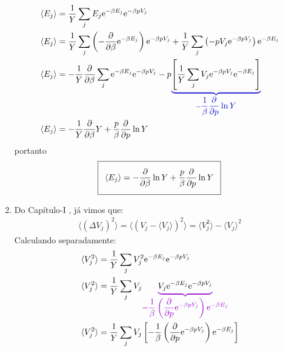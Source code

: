 \begin{prob}
\begin{sol}
\begin{enumerate}[label=\alph *)]
      \begin{align}
        \begin{split}
          \langle E_j \rangle&=\frac{1}{Y}\sum_jE_j\E^{-\beta E_j}\E^{-\beta pV_j}\\
          \langle E_j \rangle&=\frac{1}{Y}\sum_j\left(-\parder{}{\beta}\E^{-\beta E_j}\right)\E^{-\beta pV_j}+\frac{1}{Y}\sum_j\left(-pV_j\E^{-\beta pV_j}\right)\E^{-\beta E_j}\\
          \langle E_j \rangle&=-\frac{1}{Y}\parder{}{\beta}\sum_j\E^{-\beta E_j}\E^{-\beta pV_j}-p\color{deepblue}{\underbrace{
            \color{black}{\left[\frac{1}{Y}\sum_jV_j\E^{-\beta pV_j}\E^{-\beta E_j}\right]}
          }_{-\displaystyle\frac{1}{\beta}\parder{}{p}\ln Y}}\\
          \langle E_j \rangle&=-\frac{1}{Y}\parder{}{\beta}Y+\frac{p}{\beta}\parder{}{p}\ln Y
        \end{split}
      \end{align}
      portanto
      \begin{align}
        \addtolength{\fboxsep}{5pt}
        \boxed{
          \begin{gathered}
            \langle E_j \rangle=-\parder{}{\beta}\ln Y+\frac{p}{\beta}\parder{}{p}\ln Y
          \end{gathered}
        }
      \end{align}
      \item Do Capítulo-I \cite{SALINAS:2001}, já vimos que:
      \begin{align}
        \langle \left(\Delta V_j\right)^2\rangle=\langle \left(V_j-\langle V_j \rangle\right)^2 \rangle=\langle V_j^2 \rangle-\langle V_j \rangle^2       
      \end{align}
      Calculando separadamente:
      \begin{align}
        \begin{split}
          \langle V_j^2\rangle&=\frac{1}{Y}\sum_jV_j^2\E^{-\beta E_j}\E^{-\beta pV_j}\\
          \langle V_j^2\rangle&=\frac{1}{Y}\sum_jV_j
          \color{mauve}{%
            \underbrace{%
              \color{black}{%
                V_j\E^{-\beta E_j}\E^{-\beta pV_j}
              }
            }_{\displaystyle-\frac{1}{\beta}\left(\parder{}{p}\E^{-\beta pV_j}\right)\E^{-\beta E_j}}
          }\\
          \langle V_j^2\rangle&=\frac{1}{Y}\sum_jV_j\left[-\frac{1}{\beta}\left(\parder{}{p}\E^{-\beta pV_j}\right)\E^{-\beta E_j}\right]\\

\end{split}
\end{align}
\end{enumerate}
\end{sol}
\end{prob}
